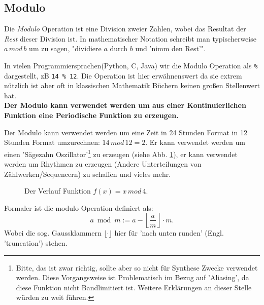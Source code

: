 

\subsection{Modulo}
Die \emph{Modulo} Operation ist eine Division zweier Zahlen, wobei das Resultat der \emph{Rest} dieser Division ist. In mathematischer Notation schreibt man typischerweise $a \, mod \, b$ um zu sagen, "dividiere $a$ durch $b$ und 'nimm den Rest'".

In vielen Programmiersprachen(Python, C, Java) wir die Modulo Operation als \texttt{\%} dargestellt, zB \texttt{14 \% 12}. Die Operation ist hier erwähnenswert da sie extrem nützlich ist aber oft in klassischen Mathematik Büchern keinen großen Stellenwert hat. \\
\textbf{Der Modulo kann verwendet werden um aus einer Kontinuierlichen Funktion eine Periodische Funktion zu erzeugen.}

Der Modulo kann verwendet werden um eine Zeit in 24 Stunden Format in 12 Stunden Format umzurechnen: $14 \, mod \, 12 = 2$. Er kann verwendet werden um einen 'Sägezahn Oszillator'\footnote{Bitte, das ist zwar richtig, sollte aber so nicht für Synthese Zwecke verwendet werden. Diese Vorgangsweise ist Problematisch im Bezug auf 'Aliasing', da diese Funktion nicht Bandlimitiert ist. Weitere Erklärungen an dieser Stelle würden zu weit führen.} zu erzeugen (siehe Abb. \ref{fig:modulo}), er kann verwendet werden um Rhythmen zu erzeugen (Andere Unterteilungen von Zählwerken/Sequencern) zu schaffen und vieles mehr.



\begin{figure}[H]
    \centering
    
    \caption{Der Verlauf Funktion $f(x) =  x \, mod \, 4$.}
    \label{fig:modulo}
\end{figure}


    Formaler ist die modulo Operation definiert als:
    $$ a{\bmod {m}}:=a-\left\lfloor {\frac {a}{m}}\right\rfloor \cdot m.$$
    Wobei die sog. Gaussklammern $\lfloor \cdot \rfloor$ hier für 'nach unten runden' (Engl. 'truncation') stehen. 

